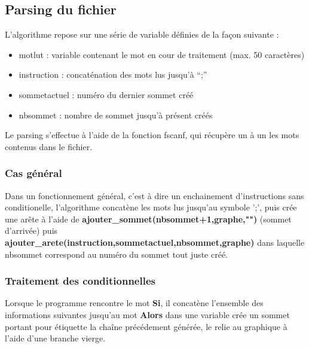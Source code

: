 \documentclass[a4paper,11pt]{article}
\begin{document}
		\subsection{Parsing du fichier}
		L'algorithme repose sur une série de variable définies de la façon suivante :
		\begin{itemize}
		\item motlut : variable contenant le mot en cour de traitement (max. 50 caractères)
		\item instruction : concaténation des mots lus jusqu'à ``;''
		\item sommetactuel : numéro du dernier sommet créé
		\item nbsommet : nombre de sommet jusqu'à présent créés
		\end{itemize}
		Le parsing s'effectue à l'aide de la fonction fscanf, qui récupère un à un les mots contenus dans le fichier.
		\subsubsection{Cas général}
		Dans un fonctionnement général, c'est à dire un enchainement d'instructions sans conditionelle, l'algorithme concatène les mots lus jusqu'au symbole ';', puis crée une arête à l'aide de \textbf{ajouter\_sommet(nbsommet+1,graphe,"")} (sommet d'arrivée) puis \textbf{ajouter\_arete(instruction,sommetactuel,nbsommet,graphe)} dans laquelle nbsommet correspond au numéro du sommet tout juste créé.
		\subsubsection{Traitement des conditionnelles}
		Lorsque le programme rencontre le mot \textbf{Si}, il concatène l'ensemble des informations suivantes jusqu'au mot \textbf{Alors} dans une variable crée un sommet portant pour étiquette la chaîne précédement générée, le relie au graphique à l'aide d'une branche vierge.
		
\end{document}
